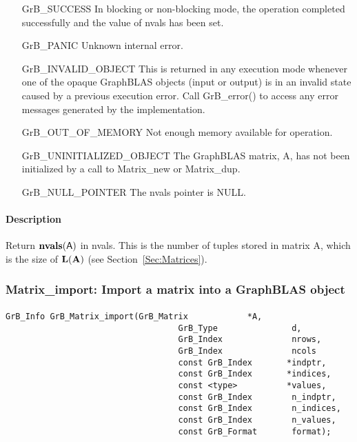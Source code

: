 \begin{itemize}[leftmargin=2.1in]
    \item[{\sf GrB\_SUCCESS}]  In blocking or non-blocking mode, the operation 
    completed successfully and the value of {\sf nvals} has been set. 

    \item[{\sf GrB\_PANIC}]    Unknown internal error.
    
    \item[{\sf GrB\_INVALID\_OBJECT}] This is returned in any execution mode 
    whenever one of the opaque GraphBLAS objects (input or output) is in an invalid 
    state caused by a previous execution error.  Call {\sf GrB\_error()} to access 
    any error messages generated by the implementation.

    \item[{\sf GrB\_OUT\_OF\_MEMORY}] Not enough memory available for operation.
    
    \item[{\sf GrB\_UNINITIALIZED\_OBJECT}]  The GraphBLAS matrix, {\sf A}, has 
    not been initialized by a call to {\sf Matrix\_new} or {\sf Matrix\_dup}.
    
    \item[{\sf GrB\_NULL\_POINTER}]  The {\sf nvals} pointer is {\sf NULL}.
\end{itemize}

\paragraph{Description}

Return $\mathbf{nvals}({\sf A})$ in {\sf nvals}.  This is the number of tuples 
stored in matrix {\sf A}, which is the size of $\mathbf{L}({\bf A})$
(see Section~\ref{Sec:Matrices}).

\subsubsection{{\sf Matrix\_import}: Import a matrix into a GraphBLAS object}
\label{Sec:Matrix_import}

\paragraph{\syntax}

\begin{Verbatim}[samepage=true]    
        GrB_Info GrB_Matrix_import(GrB_Matrix            *A,
                                   GrB_Type               d,
                                   GrB_Index              nrows,
                                   GrB_Index              ncols
                                   const GrB_Index       *indptr,
                                   const GrB_Index       *indices,
                                   const <type>          *values,
                                   const GrB_Index        n_indptr,
                                   const GrB_Index        n_indices,
                                   const GrB_Index        n_values,
                                   const GrB_Format       format);
\end{Verbatim}

